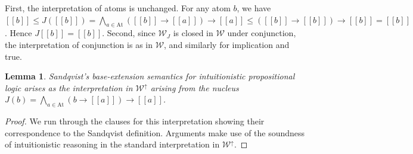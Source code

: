 \documentclass{sn-jnl}
\newcommand{\At}{\text{At}}
\newcommand{\worlds}{\mathcal W}
\newcommand{\db}[1]{[\![#1]\!]}
\newtheorem{lemma}[theorem]{Lemma}
\begin{document}
First, the interpretation of atoms is unchanged. For any atom $b$, we have 
$\db{b} \leq J(\db{b}) = \bigwedge_{a\in\At} (\db{b}\to \db{a})\to \db{a} \leq (\db{b}\to \db{b})\to \db{b} = \db{b}$. Hence $J\db{b}=\db{b}$. Second, since $\worlds_J$ is closed in $\worlds$ under conjunction, the interpretation of conjunction is as in $\worlds$, and similarly for implication and true. 

\smallskip 

\begin{lemma}
Sandqvist's base-extension semantics for intuitionistic propositional logic arises as %
the interpretation in $\worlds^\uparrow$ arising from the nucleus $J(b) = \bigwedge_{a\in\At} (b \to \db{a}) \to \db{a}$.
\end{lemma}
\begin{proof}
    We run through the clauses for this interpretation showing their correspondence to the Sandqvist definition. Arguments make use of the soundness of intuitionistic reasoning in the standard interpretation in $\worlds^\uparrow$.

\smallskip 
    

\end{proof}
\end{document}
